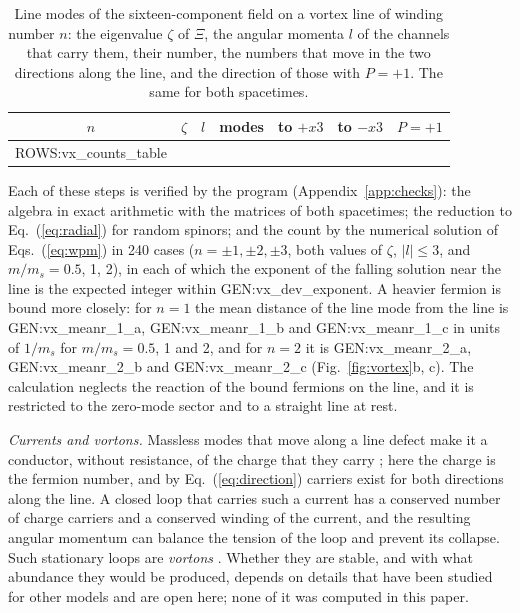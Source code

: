 \begin{table}
\caption{\label{tab:linemodes}Line modes of the sixteen-component field on a vortex line of winding
number $n$: the eigenvalue $\zeta$ of $\Xi$, the angular momenta $l$ of the channels that carry
them, their number, the numbers that move in the two directions along the line, and the direction
of those with $P=+1$. The same for both spacetimes.}
\begin{ruledtabular}
\begin{tabular}{ccccccc}
$n$ & $\zeta$ & $l$ & modes & to $+x3$ & to $-x3$ & $P=+1$ \\
\hline
{{ROWS:vx_counts_table}}
\end{tabular}
\end{ruledtabular}
\end{table}

Each of these steps is verified by the program (Appendix~\ref{app:checks}): the algebra in exact
arithmetic with the matrices of both spacetimes; the reduction to Eq.~(\ref{eq:radial}) for random
spinors; and the count by the numerical solution of Eqs.~(\ref{eq:wpm}) in 240 cases
($n=\pm1,\pm2,\pm3$, both values of $\zeta$, $|l|\le3$, and $m/m_s=0.5$, 1, 2), in each of which
the exponent of the falling solution near the line is the expected integer within
{{GEN:vx_dev_exponent}}. A heavier fermion is bound more closely: for $n=1$ the mean distance of
the line mode from the line is {{GEN:vx_meanr_1_a}}, {{GEN:vx_meanr_1_b}} and
{{GEN:vx_meanr_1_c}} in units of $1/m_s$ for $m/m_s=0.5$, 1 and 2, and for $n=2$ it is
{{GEN:vx_meanr_2_a}}, {{GEN:vx_meanr_2_b}} and {{GEN:vx_meanr_2_c}} (Fig.~\ref{fig:vortex}b, c).
The calculation neglects the reaction of the bound fermions on the line, and it is restricted to
the zero-mode sector and to a straight line at rest.

\emph{Currents and vortons.} Massless modes that move along a line defect make it a conductor,
without resistance, of the charge that they carry \cite{Witten1985}; here the charge is the fermion
number, and by Eq.~(\ref{eq:direction}) carriers exist for both directions along the line. A closed
loop that carries such a current has a conserved number of charge carriers and a conserved winding
of the current, and the resulting angular momentum can balance the tension of the loop and prevent
its collapse. Such stationary loops are \emph{vortons} \cite{DavisShellard1989}. Whether they are
stable, and with what abundance they would be produced, depends on details that have been studied
for other models and are open here; none of it was computed in this paper.

